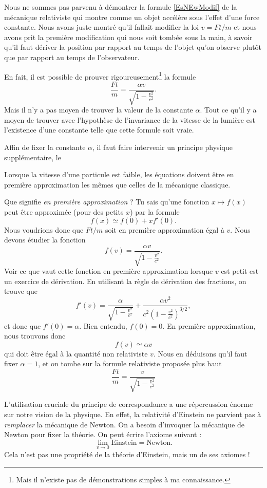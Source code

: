 Nous ne sommes pas parvenu à démontrer la formule \eqref{EsNEwModif} de la mécanique relativiste qui montre comme un objet accélère sous l'effet d'une force constante. Nous avons juste montré qu'il fallait modifier la loi $v=Ft/m$ et nous avons prit la première modification qui nous soit tombée sous la main, à savoir qu'il faut dériver la position par rapport au temps de l'objet qu'on observe plutôt que par rapport au temps de l'observateur.

En fait, il est possible de prouver rigoureusement\footnote{Mais il n'existe pas de démonstrations simples à ma connaissance.} la formule
\[
  \frac{ Ft }{ m }=\frac{ \alpha v }{ \sqrt{1-\frac{ v^2 }{ c^2 }} }.
\]
Mais il n'y a pas moyen de trouver la valeur de la constante $\alpha$. Tout ce qu'il y a moyen de trouver avec l'hypothèse de l'invariance de la vitesse de la lumière est l'existence d'une constante telle que cette formule soit vraie.

Affin de fixer la constante $\alpha$, il faut faire intervenir un principe physique supplémentaire, le 
\begin{loiphyz}
Lorsque la vitesse d'une particule est faible, les équations doivent être en première approximation les mêmes que celles de la mécanique classique.
\end{loiphyz}
Que signifie \emph{en première approximation} ? Tu sais qu'une fonction $x\mapsto f(x)$ peut être approximée (pour des petits $x$) par la formule
\[
  f(x)\simeq f(0)+xf'(0).
\]
Nous voudrions donc que $Ft/m$ soit en première approximation égal à $v$. Nous devons étudier la fonction
\[
  f(v)=\frac{ \alpha v }{ \sqrt{1-\frac{ v^2 }{ c^2 }} }.
\]
Voir ce que vaut cette fonction en première approximation lorsque $v$ est petit est un exercice de dérivation. En utilisant la règle de dérivation des fractions, on trouve que
\[
  f'(v)=\frac{ \alpha }{ \sqrt{1-\frac{ v^2 }{ c^2 }} }+\frac{ \alpha v^2 }{ c^2\left( 1-\frac{ v^2 }{ c^2 } \right)^{3/2} },
\]
et donc que $f'(0)=\alpha$. Bien entendu, $f(0)=0$. En première approximation, nous trouvons donc
\begin{equation}
f(v)\simeq \alpha v
\end{equation}
qui doit être égal à la quantité non relativiste $v$. Nous en déduisons qu'il faut fixer $\alpha=1$, et on tombe sur la formule relativiste proposée plus haut
\[
  \frac{ Ft }{ m }=\frac{ v }{ \sqrt{1-\frac{ v^2 }{ c^2 }} }
\]

L'utilisation cruciale du principe de correspondance a une répercussion énorme sur notre vision de la physique. En effet, la relativité d'Einstein ne parvient pas à \emph{remplacer} la mécanique de Newton. On a besoin d'invoquer la mécanique de Newton pour fixer la théorie. On peut écrire l'axiome suivant :
\begin{equation}
 \lim_{v\to 0}\text{Einstein}=\text{Newton}.
\end{equation}
Cela n'est pas une propriété de la théorie d'Einstein, mais un de ses axiomes !

